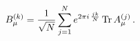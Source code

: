 \begin{equation}
B_\mu^{(k)}={1 \over \sqrt{N}} 
\sum_{j=1}^N e^{2 \pi i \, {jk \over N}} \, {\rm Tr}\, A_\mu^{(j)} \, . 
\label{Bmu}
\end{equation}

